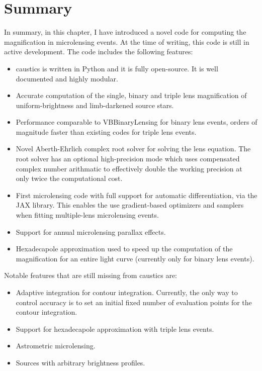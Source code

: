 \documentclass[12pt,dvipsnames]{report}
\newcommand{\ssf}[1]{\textsf{#1}}
\begin{document}
\section{Summary}
\label{sec:exo_summary}
In summary, in this chapter, I have introduced a novel code for computing the magnification
in microlensing events. At the time of writing, this code is still in active development.
The code includes the following features:
\begin{itemize}
    \item \ssf{caustics} is written in Python and it is fully open-source. It is well 
    documented and highly modular.
    \item Accurate computation of the single, binary and triple lens magnification 
    of uniform-brightness and limb-darkened source stars.
    \item Performance comparable to VBBinaryLensing for binary lens events, orders of 
    magnitude faster than existing codes for triple lens events.
    \item Novel Aberth-Ehrlich complex root solver for solving the lens equation. The 
    root solver has an optional high-precision mode which uses compensated complex number 
    arithmatic to effectively double the working precision at only twice the computational 
    cost.
    \item First microlensing code with full support for automatic differentiation,
    via the \ssf{JAX} library. This enables the use gradient-based optimizers and 
    samplers when fitting multiple-lens microlensing events.
    \item Support for annual microlensing parallax effects.
    \item Hexadecapole approximation used to speed up the computation of the 
    magnification for an entire light curve (currently only for binary lens events).
\end{itemize}
Notable features that are still missing from \ssf{caustics} are:
\begin{itemize}
    \item Adaptive integration for contour integration. Currently, the only way to control
    accuracy is to set an initial fixed number of evaluation points for the contour 
    integration. 
    \item Support for hexadecapole approximation with triple lens events.
    \item Astrometric microlensing.
    \item Sources with arbitrary brightness profiles.
\end{itemize}
\end{document}
